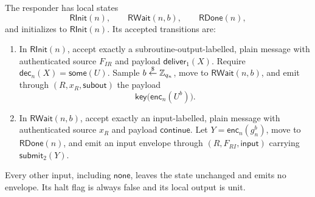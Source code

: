 \begin{definition}
\label{def:dhke-responder-program}
\notready
The responder has local states
\[
  \mathsf{RInit}(n),
  \qquad
  \mathsf{RWait}(n,b),
  \qquad
  \mathsf{RDone}(n),
\]
and initializes to \(\mathsf{RInit}(n)\).  Its accepted transitions are:
\begin{enumerate}
\item In \(\mathsf{RInit}(n)\), accept exactly a subroutine-output-labelled,
      plain message with authenticated source \(F_{IR}\) and payload
      \(\mathsf{deliver}_1(X)\).  Require
      \(\mathsf{dec}_n(X)=\mathsf{some}(U)\).  Sample
      \(b\stackrel{\smash{\$}}\gets\mathbb Z_{q_n}\), move to \(\mathsf{RWait}(n,b)\), and emit
      through \((R,x_R,\mathsf{subout})\) the payload
      \[
        \mathsf{key}\bigl(\mathsf{enc}_n(U^b)\bigr).
      \]
\item In \(\mathsf{RWait}(n,b)\), accept exactly an input-labelled, plain
      message with authenticated source \(x_R\) and payload
      \(\mathsf{continue}\).  Let
      \(Y=\mathsf{enc}_n(g_n^b)\), move to \(\mathsf{RDone}(n)\), and emit an
      input envelope through \((R,F_{RI},\mathsf{input})\) carrying
      \(\mathsf{submit}_2(Y)\).
\end{enumerate}
Every other input, including \(\mathsf{none}\), leaves the state unchanged and
emits no envelope.  Its halt flag is always false and its local output is unit.
\end{definition}

